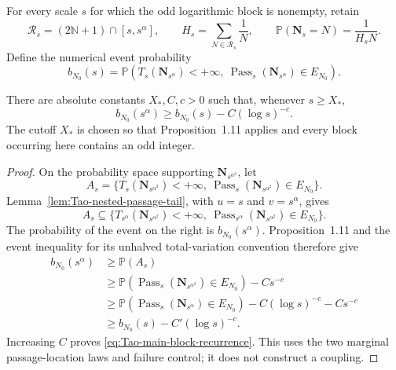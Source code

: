 For every scale \(s\) for which the odd logarithmic block is nonempty,
retain
\[
 \mathcal R_s=(2\mathbb N+1)\cap[s,s^\alpha],
 \qquad H_s=\sum_{N\in\mathcal R_s}\frac1N,
 \qquad
 \mathbb P(\mathbf N_s=N)=\frac1{H_sN}.
\]
Define the numerical event probability
\begin{equation}
\label{eq:Tao-main-bs}
 b_{N_0}(s)=\mathbb P\left(
  T_s(\mathbf N_{s^\alpha})<+\infty,
  \ \operatorname{Pass}_s(\mathbf N_{s^\alpha})\in E_{N_0}
 \right).
\end{equation}

\begin{proposition}
\label{prop:Tao-main-block-recurrence}
There are absolute constants \(X_*,C,c>0\) such that, whenever
\(s\geq X_*\),
\begin{equation}
\label{eq:Tao-main-block-recurrence}
 b_{N_0}(s^\alpha)
 \geq b_{N_0}(s)-C(\log s)^{-c}.
\end{equation}
The cutoff \(X_*\) is chosen so that Proposition~1.11 applies and every
block occurring here contains an odd integer.
\end{proposition}

\begin{proof}
On the probability space supporting \(\mathbf N_{s^{\alpha^2}}\), let
\[
 A_s=\{T_s(\mathbf N_{s^{\alpha^2}})<+\infty,
 \ \operatorname{Pass}_s(\mathbf N_{s^{\alpha^2}})\in E_{N_0}\}.
\]
Lemma~\ref{lem:Tao-nested-passage-tail}, with \(u=s\) and
\(v=s^\alpha\), gives
\[
 A_s\subseteq
 \{T_{s^\alpha}(\mathbf N_{s^{\alpha^2}})<+\infty,
 \ \operatorname{Pass}_{s^\alpha}
       (\mathbf N_{s^{\alpha^2}})\in E_{N_0}\}.
\]
The probability of the event on the right is
\(b_{N_0}(s^\alpha)\).  Proposition~1.11 and the event inequality for its
unhalved total-variation convention therefore give
\begin{align*}
 b_{N_0}(s^\alpha)
 &\geq\mathbb P(A_s)\\
 &\geq
 \mathbb P(\operatorname{Pass}_s(\mathbf N_{s^{\alpha^2}})
             \in E_{N_0})-Cs^{-c}\\
 &\geq
 \mathbb P(\operatorname{Pass}_s(\mathbf N_{s^\alpha})
             \in E_{N_0})
       -C(\log s)^{-c}-Cs^{-c}\\
 &\geq b_{N_0}(s)-C'(\log s)^{-c}.
\end{align*}
Increasing \(C\) proves \eqref{eq:Tao-main-block-recurrence}.  This uses
the two marginal passage-location laws and failure control; it does not
construct a coupling.
\end{proof}


